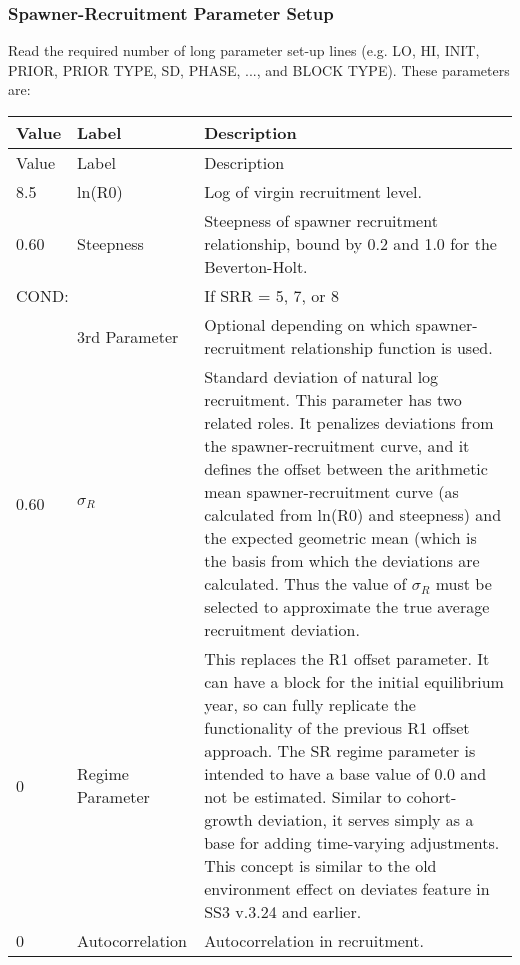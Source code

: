 \subsubsection{Spawner-Recruitment Parameter Setup}
Read the required number of long parameter set-up lines (e.g. LO, HI, INIT, PRIOR, PRIOR TYPE, SD, PHASE, ..., and BLOCK TYPE).  These parameters are:
\begin{longtable}{p{1cm} p{3cm} p{11cm}}
	\hline
	Value & Label &  Description\Tstrut\Bstrut\\
	\hline
	\endfirsthead

	\hline
	Value & Label &  Description\Tstrut\Bstrut\\
	\hline
	\endhead
	\hline
	\endfoot
	\endlastfoot

	8.5 & ln(R0) & Log of virgin recruitment level. \Tstrut\Bstrut\\
	\hline

	0.60 \Tstrut & Steepness  & Steepness of spawner recruitment relationship, bound by 0.2 and 1.0 for the Beverton-Holt.\Bstrut\\

	\multicolumn{2}{l}{COND:} \Tstrut & If SRR = 5, 7, or 8\\
	& 3rd Parameter & Optional depending on which spawner-recruitment relationship function is used.\Bstrut\\
	\hline

	0.60 \Tstrut & $\sigma_R$ &  Standard deviation of natural log recruitment. This parameter has two related roles.  It penalizes deviations from the spawner-recruitment curve, and it defines the offset between the arithmetic mean spawner-recruitment curve (as calculated from ln(R0) and steepness) and the expected geometric mean (which is the basis from which the deviations are calculated. Thus the value of $\sigma_R$ must be selected to approximate the true average recruitment deviation.\Bstrut\\

	0\Tstrut & Regime Parameter & This replaces the R1 offset parameter. It can have a block for the initial equilibrium year, so can fully replicate the functionality of the previous R1 offset approach. The SR regime parameter is intended to have a base value of 0.0 and not be estimated. Similar to cohort-growth deviation, it serves simply as a base for adding time-varying adjustments. This concept is similar to the old environment effect on deviates feature in SS3 v.3.24 and earlier.\Bstrut\\
	\hline

	0 & Autocorrelation & Autocorrelation in recruitment.\Tstrut\Bstrut\\
	\hline
\end{longtable}


